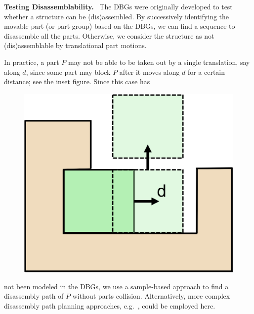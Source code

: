 
\vspace*{1.0mm}
\noindent
{\bf Testing Disassemblability.} \
The DBGs were originally developed to test whether a structure can be (dis)assembled.
By successively identifying the movable part (or part group) based on the DBGs, we can find a sequence to disassemble all the parts. 
Otherwise, we consider the structure as not (dis)assemblable by translational part motions.

In practice, a part $P$ may not be able to be taken out by a single translation, say along $d$, since some part may block $P$ after it 
moves along $d$ for a certain distance; see the inset figure.
Since this case has 
\setlength{\columnsep}{13pt}
\begin{figure}
	\vspace{-12pt}
	\centering
	\hspace{-8pt}
	\includegraphics[width=0.28\columnwidth]{images/Multi_step.png}
	\vspace{-11pt}
\end{figure}
not been modeled in the DBGs, we use a sample-based approach to find a disassembly path of $P$ without parts collision.
Alternatively, more complex disassembly path planning approaches, e.g.~\cite{Ghandi-2015-AssemblyPlanningReview}, could be employed here.











